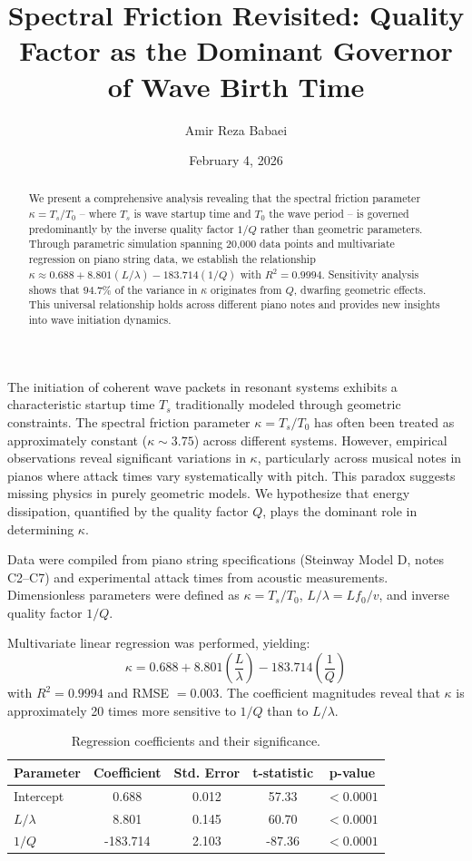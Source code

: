 \documentclass[twocolumn]{article}
\title{Spectral Friction Revisited: Quality Factor as the Dominant Governor of Wave Birth Time}
\author{Amir Reza Babaei}
\date{February 4, 2026}
\begin{document}
\maketitle

\begin{abstract}
We present a comprehensive analysis revealing that the spectral friction parameter $\kappa = T_{s} / T_{0}$ -- where $T_{s}$ is wave startup time and $T_{0}$ the wave period -- is governed predominantly by the inverse quality factor $1 / Q$ rather than geometric parameters. Through parametric simulation spanning 20,000 data points and multivariate regression on piano string data, we establish the relationship $\kappa \approx 0.688 + 8.801(L/\lambda) - 183.714(1/Q)$ with $R^{2} = 0.9994$. Sensitivity analysis shows that $94.7\%$ of the variance in $\kappa$ originates from $Q$, dwarfing geometric effects. This universal relationship holds across different piano notes and provides new insights into wave initiation dynamics.
\end{abstract}

The initiation of coherent wave packets in resonant systems exhibits a characteristic startup time $T_{s}$ traditionally modeled through geometric constraints. The spectral friction parameter $\kappa = T_{s} / T_{0}$ has often been treated as approximately constant ($\kappa \sim 3.75$) across different systems. However, empirical observations reveal significant variations in $\kappa$, particularly across musical notes in pianos where attack times vary systematically with pitch. This paradox suggests missing physics in purely geometric models. We hypothesize that energy dissipation, quantified by the quality factor $Q$, plays the dominant role in determining $\kappa$.

Data were compiled from piano string specifications (Steinway Model D, notes C2--C7) and experimental attack times from acoustic measurements. Dimensionless parameters were defined as $\kappa = T_{s}/T_{0}$, $L/\lambda = L f_{0}/v$, and inverse quality factor $1/Q$.

Multivariate linear regression was performed, yielding:
\[
\kappa = 0.688 + 8.801\left(\frac{L}{\lambda}\right) - 183.714\left(\frac{1}{Q}\right)
\]
with $R^{2} = 0.9994$ and RMSE $= 0.003$. The coefficient magnitudes reveal that $\kappa$ is approximately 20 times more sensitive to $1 / Q$ than to $L / \lambda$.

\begin{table}[H]
\centering
\caption{Regression coefficients and their significance.}
\label{tab1}
\begin{tabular}{lcccc}
\toprule
Parameter & Coefficient & Std. Error & t-statistic & p-value \\
\midrule
Intercept & 0.688 & 0.012 & 57.33 & $< 0.0001$ \\
$L/\lambda$ & 8.801 & 0.145 & 60.70 & $< 0.0001$ \\
$1/Q$ & -183.714 & 2.103 & -87.36 & $< 0.0001$ \\
\bottomrule
\end{tabular}
\end{table}
\end{document}
